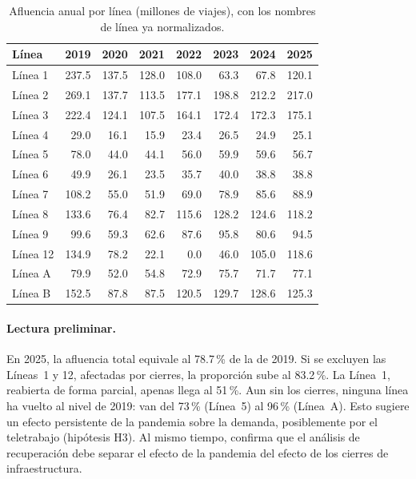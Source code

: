 \begin{table}[h]
\centering
\caption{Afluencia anual por línea (millones de viajes), con los nombres de línea ya normalizados.}\label{tab:lineas}
\small
\begin{tabular}{lrrrrrrr}
\toprule
\textbf{Línea} & 2019 & 2020 & 2021 & 2022 & 2023 & 2024 & 2025\\
\midrule
Línea 1  & 237.5 & 137.5 & 128.0 & 108.0 & 63.3  & 67.8  & 120.1\\
Línea 2  & 269.1 & 137.7 & 113.5 & 177.1 & 198.8 & 212.2 & 217.0\\
Línea 3  & 222.4 & 124.1 & 107.5 & 164.1 & 172.4 & 172.3 & 175.1\\
Línea 4  & 29.0  & 16.1  & 15.9  & 23.4  & 26.5  & 24.9  & 25.1\\
Línea 5  & 78.0  & 44.0  & 44.1  & 56.0  & 59.9  & 59.6  & 56.7\\
Línea 6  & 49.9  & 26.1  & 23.5  & 35.7  & 40.0  & 38.8  & 38.8\\
Línea 7  & 108.2 & 55.0  & 51.9  & 69.0  & 78.9  & 85.6  & 88.9\\
Línea 8  & 133.6 & 76.4  & 82.7  & 115.6 & 128.2 & 124.6 & 118.2\\
Línea 9  & 99.6  & 59.3  & 62.6  & 87.6  & 95.8  & 80.6  & 94.5\\
Línea 12 & 134.9 & 78.2  & 22.1  & 0.0   & 46.0  & 105.0 & 118.6\\
Línea A  & 79.9  & 52.0  & 54.8  & 72.9  & 75.7  & 71.7  & 77.1\\
Línea B  & 152.5 & 87.8  & 87.5  & 120.5 & 129.7 & 128.6 & 125.3\\
\bottomrule
\end{tabular}
\end{table}

\paragraph{Lectura preliminar.} En 2025, la afluencia total equivale al 78.7\,\% de la de 2019.
Si se excluyen las Líneas~1 y 12, afectadas por cierres, la proporción sube al 83.2\,\%. La Línea~1,
reabierta de forma parcial, apenas llega al 51\,\%. Aun sin los cierres, ninguna línea ha vuelto al
nivel de 2019: van del 73\,\% (Línea~5) al 96\,\% (Línea~A). Esto sugiere un efecto persistente de
la pandemia sobre la demanda, posiblemente por el teletrabajo (hipótesis H3). Al mismo tiempo,
confirma que el análisis de recuperación debe separar el efecto de la pandemia del efecto de los
cierres de infraestructura.

